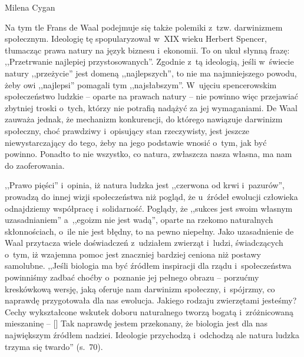 \begin{recplenv}{Milena Cygan}
\enlargethispage{-.5\baselineskip}

Na tym tle Frans de Waal podejmuje się także polemiki z~tzw. darwinizmem społecznym. Ideologię tę spopularyzował w~XIX
wieku Herbert Spencer, tłumacząc prawa natury na język biznesu i~ekonomii. To on ukuł słynną frazę: ,,Przetrwanie
najlepiej przystosowanych''. Zgodnie z~tą ideologią, jeśli w~świecie natury ,,przeżycie'' jest domeną ,,najlepszych'', to
nie ma najmniejszego powodu, żeby owi ,,najlepsi'' pomagali tym ,,najsłabszym''. W~ujęciu spencerowskim społeczeństwo
ludzkie -- oparte na prawach natury -- nie powinno więc przejawiać zbytniej troski o~tych, którzy nie potrafią nadążyć za
jej wymaganiami. De Waal zauważa jednak, że mechanizm konkurencji, do którego nawiązuje darwinizm społeczny, choć
prawdziwy i~opisujący stan rzeczywisty, jest jeszcze niewystarczający do tego, żeby na jego podstawie wnosić o~tym, jak
być powinno. Ponadto to nie wszystko, co natura, zwłaszcza nasza własna, ma nam do zaoferowania. 

,,Prawo pięści'' i~opinia, iż natura ludzka jest ,,czerwona od krwi i~pazurów'', prowadzą do innej wizji społeczeństwa niż
pogląd, że u~źródeł ewolucji człowieka odnajdziemy współpracę i~solidarność. Poglądy, że ,,sukces jest swoim własnym
uzasadnianiem'' a~,,egoizm nie jest wadą'', oparte na rzekomo naturalnych skłonnościach, o~ile nie jest błędny, to na
pewno niepełny. Jako uzasadnienie de Waal przytacza wiele doświadczeń z~udziałem zwierząt i~ludzi, świadczących o~tym,
iż wzajemna pomoc jest znaczniej bardziej ceniona niż postawy samolubne. ,,Jeśli biologia ma być źródłem inspiracji dla
rządu i~społeczeństwa powinniśmy zadbać choćby o~poznanie jej pełnego obrazu -- porzućmy kreskówkową wersję, jaką
oferuje nam darwinizm społeczny, i~spójrzmy, co naprawdę przygotowała dla nas ewolucja. Jakiego rodzaju zwierzętami
jesteśmy? Cechy wykształcone wskutek doboru naturalnego tworzą bogatą i~zróżnicowaną mieszaninę -- [\mydots] Tak naprawdę
jestem przekonany, że biologia jest dla nas największym źródłem nadziei. Ideologie przychodzą i~odchodzą ale natura
ludzka trzyma się twardo'' (s.~70).


\end{recplenv}
